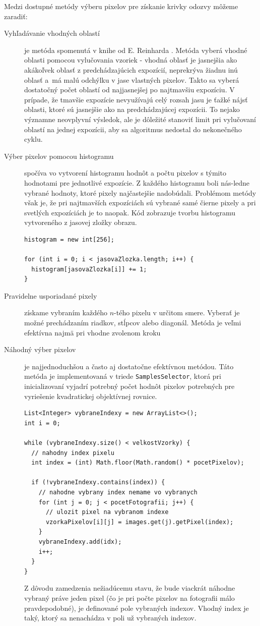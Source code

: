 Medzi dostupné metódy výberu pixelov pre získanie krivky odozvy môžeme zaradiť:
\begin{description}
  \item [Vyhľadávanie vhodných oblastí] je metóda spomenutá v knihe od E. Reinharda \cite{HDRI}. Metóda vyberá
  vhodné oblasti pomocou vylučovania vzoriek - vhodná oblasť je jasnejšia ako akákoľvek oblasť z predchádzajúcich
  expozícií, neprekrýva žiadnu inú oblasť a~má malú odchýlku v jase vlastných pixelov. Takto sa vyberá dostatočný
  počet oblastí od najjasnejšej po najtmavšiu expozíciu. V prípade, že tmavšie expozície nevyužívajú celý rozsah
  jasu je ťažké nájsť oblasti, ktoré sú jasnejšie ako na predchádzajúcej expozícii. To nejako významne neovplyvní
  výsledok, ale je dôležité stanoviť limit pri vylučovaní oblastí na jednej expozícii, aby sa algoritmus nedostal
  do nekonečného cyklu.

  \item [Výber pixelov pomocou histogramu] spočíva vo vytvorení histogramu hodnôt a počtu pixelov s týmito
  hodnotami pre jednotlivé expozície. Z každého histogramu boli nás-ledne vybrané hodnoty, ktoré pixely najčastejšie
  nadobúdali. Problémom metódy však je, že pri najtmavších expozíciách sú vybrané samé čierne pixely a pri svetlých
  expozíciách je to naopak. Kód zobrazuje tvorbu histogramu vytvoreného z jasovej zložky obrazu.
\begin{lstlisting}[]
histogram = new int[256];

for (int i = 0; i < jasovaZlozka.length; i++) {
  histogram[jasovaZlozka[i]] += 1;
}
\end{lstlisting}
  
  \item [Pravidelne usporiadané pixely] získame vybraním každého $n$-tého pixelu v určitom smere. Vyberať je možné
  prechádzaním riadkov, stĺpcov alebo diagonál. Metóda je veľmi efektívna najmä pri vhodne zvolenom kroku
  
  \item [Náhodný výber pixelov] je najjednoduchšou a často aj dostatočne efektívnou metódou. Táto metóda je
  implementovaná v triede \texttt{SamplesSelector}, ktorá pri inicializovaní vyjadrí potrebný počet hodnôt pixelov
  potrebných pre vyriešenie kvadratickej objektívnej rovnice.
\begin{lstlisting}[]
List<Integer> vybraneIndexy = new ArrayList<>();
int i = 0;

while (vybraneIndexy.size() < velkostVzorky) {
  // nahodny index pixelu
  int index = (int) Math.floor(Math.random() * pocetPixelov);

  if (!vybraneIndexy.contains(index)) {
    // nahodne vybrany index nemame vo vybranych
    for (int j = 0; j < pocetFotografii; j++) {
      // ulozit pixel na vybranom indexe
      vzorkaPixelov[i][j] = images.get(j).getPixel(index);
    }
    vybraneIndexy.add(idx);
    i++;
  }
}
\end{lstlisting}
  Z dôvodu zamedzenia nežiadúcemu stavu, že bude
  viackrát náhodne vybraný práve jeden pixel (čo je pri počte pixelov na fotografii málo pravdepodobné),
  je definované pole vybraných indexov. Vhodný index je taký, ktorý sa nenachádza v poli už vybraných indexov.
\end{description}

